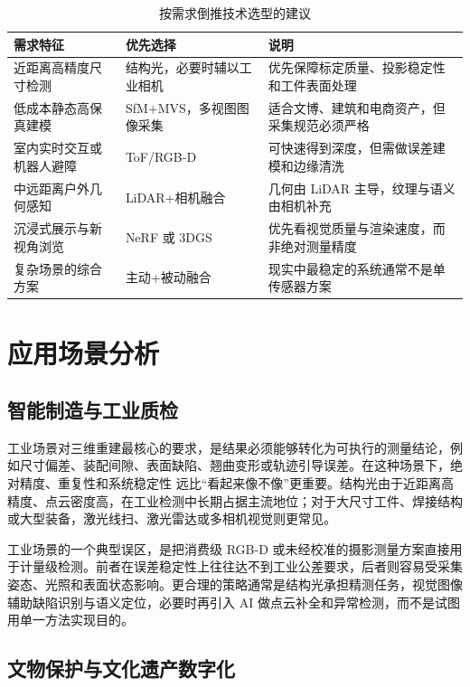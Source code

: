 \documentclass[12pt,a4paper]{ctexart}
\begin{document}
\begin{table}[H]
\centering
\small
\caption{按需求倒推技术选型的建议}
\begin{tabularx}{\textwidth}{>{\raggedright\arraybackslash}p{3.3cm} >{\raggedright\arraybackslash}X >{\raggedright\arraybackslash}p{3.6cm}}
\toprule
需求特征 & 优先选择 & 说明 \\
\midrule
近距离高精度尺寸检测 & 结构光，必要时辅以工业相机 & 优先保障标定质量、投影稳定性和工件表面处理 \\
低成本静态高保真建模 & SfM+MVS，多视图图像采集 & 适合文博、建筑和电商资产，但采集规范必须严格 \\
室内实时交互或机器人避障 & ToF/RGB-D & 可快速得到深度，但需做误差建模和边缘清洗 \\
中远距离户外几何感知 & LiDAR+相机融合 & 几何由 LiDAR 主导，纹理与语义由相机补充 \\
沉浸式展示与新视角浏览 & NeRF 或 3DGS & 优先看视觉质量与渲染速度，而非绝对测量精度 \\
复杂场景的综合方案 & 主动+被动融合 & 现实中最稳定的系统通常不是单传感器方案 \\
\bottomrule
\end{tabularx}
\end{table}

\section{应用场景分析}

\subsection{智能制造与工业质检}

工业场景对三维重建最核心的要求，是结果必须能够转化为可执行的测量结论，例如尺寸偏差、装配间隙、表面缺陷、翘曲变形或轨迹引导误差。在这种场景下，绝对精度、重复性和系统稳定性 远比“看起来像不像”更重要。结构光由于近距离高精度、点云密度高，在工业检测中长期占据主流地位；对于大尺寸工件、焊接结构或大型装备，激光线扫、激光雷达或多相机视觉则更常见。\cite{salvi2010,cheng2018laser}

工业场景的一个典型误区，是把消费级 RGB-D 或未经校准的摄影测量方案直接用于计量级检测。前者在误差稳定性上往往达不到工业公差要求，后者则容易受采集姿态、光照和表面状态影响。更合理的策略通常是结构光承担精测任务，视觉图像辅助缺陷识别与语义定位，必要时再引入 AI 做点云补全和异常检测，而不是试图用单一方法实现目的。

\subsection{文物保护与文化遗产数字化}
\end{document}
